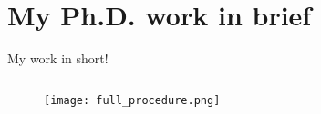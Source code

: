 \documentclass[10pt,aspectratio=169,dvipsnames]{beamer} %
\begin{document}
	\section{My Ph.D. work in brief}
	\begin{frame}{My work in short!}
		\begin{columns}[T]
			\begin{column}[c]{0.9\textwidth}
				\begin{figure}
					\centering
					\texttt{[image: full\_procedure.png]}	
				\end{figure}		
			\end{column}
		\end{columns}		
	\end{frame}
	\setcounter{subfigure}{0}	
\end{document}
